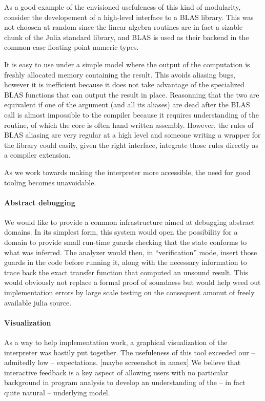 \documentclass[11pt]{article}
\begin{document}
As a good example of the envisioned usefuleness of this kind of modularity, consider the developement of a high-level interface to a BLAS library.
This was not choosen at random since the linear algebra routines are in fact a sizable chunk of the Julia standard library, and BLAS is used as their backend in the common case floating point numeric types.

It is easy to use under a simple model where the output of the computation is freshly allocated memory containing the result. This avoids aliasing bugs, however it is inefficient because it does not take advantage of the specialized BLAS functions that can output the result in place. Reasonning that the two are equivalent if one of the argument (and all its aliases) are dead after the BLAS call is almost impossible to the compiler because it requires understanding of the routine, of which the core is often hand written assembly.
However, the rules of BLAS aliasing are very regular at a high level and someone writing a wrapper for the library could easily, given the right interface, integrate those rules directly as a compiler extension.

As we work towards making the interpreter more accessible, the need for good tooling becomes unavoidable.

\paragraph{Abstract debugging} We would like to provide a common infrastructure aimed at debugging abstract domains.
In its simplest form, this system would open the possibility for a domain to provide small run-time guards checking that the state conforms to what was inferred.
The analyzer would then, in ``verification'' mode, insert those guards in the code before running it, along with the necessary information to trace back the exact transfer function that computed an unsound result.
This would obviously not replace a formal proof of soundness but would help weed out implementation errors by large scale testing on the consequent amonut of freely available julia source.

\paragraph{Visualization} As a way to help implementation work, a graphical visualization of the interpreter was hastily put together.
The usefuleness of this tool exceeded our -- admitedly low -- expectations. [maybe screenshot in annex]
We believe that interactive feedback is a key aspect of allowing users with no particular background in program analysis to develop an understanding of the -- in fact quite natural -- underlying model.
\end{document}
